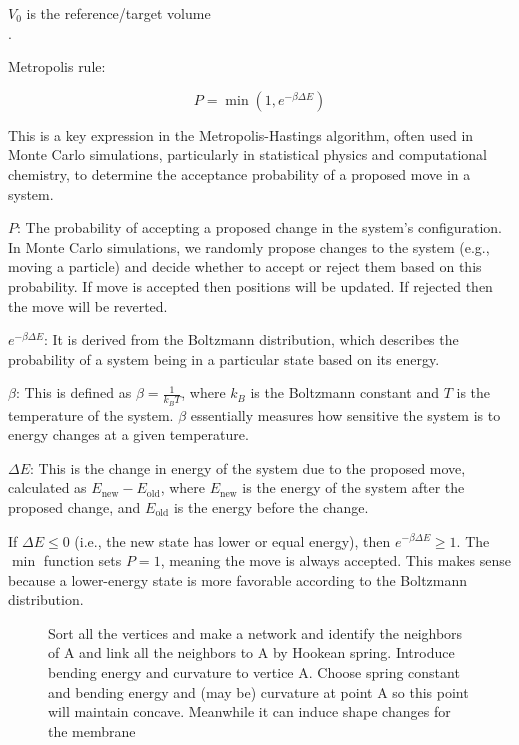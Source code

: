 \documentclass[12pt]{article}
\begin{document}
\begin{flushleft}
$V_0$ is the reference/target volume\\





.


Metropolis rule:

\begin{equation}
P = \min\left(1, e^{-\beta \Delta E}\right)
\end{equation}

This is a key expression in the Metropolis-Hastings algorithm, often used in Monte Carlo simulations, particularly in statistical physics and computational chemistry, to determine the acceptance probability of a proposed move in a system.


\noindent $P$: The probability of accepting a proposed change in the system's configuration. In Monte Carlo simulations, we randomly propose changes to the system (e.g., moving a particle) and decide whether to accept or reject them based on this probability. If move is accepted then positions will be updated. If rejected then the move will be reverted.

\noindent $e^{-\beta \Delta E}$: It is derived from the Boltzmann distribution, which describes the probability of a system being in a particular state based on its energy.

\noindent $\beta$: This is defined as $\beta = \frac{1}{k_B T}$, where $k_B$ is the Boltzmann constant and $T$ is the temperature of the system. $\beta$ essentially measures how sensitive the system is to energy changes at a given temperature.

\noindent $\Delta E$: This is the change in energy of the system due to the proposed move, calculated as $E_{\text{new}} - E_{\text{old}}$, where $E_{\text{new}}$ is the energy of the system after the proposed change, and $E_{\text{old}}$ is the energy before the change.


If $\Delta E \leq 0$ (i.e., the new state has lower or equal energy), then $e^{-\beta \Delta E} \geq 1$. The $\min$ function sets $P = 1$, meaning the move is always accepted. This makes sense because a lower-energy state is more favorable according to the Boltzmann distribution.

\begin{figure}[!ht]
  \centering
  \caption{Sort all the vertices and make a network and identify the neighbors of A and link all the neighbors to A by Hookean spring. Introduce bending energy and curvature to vertice A.
Choose spring constant and bending energy and (may be) curvature at point A so this point will maintain concave. Meanwhile it can induce shape changes for the membrane}
\end{figure}



\end{flushleft}
\end{document}
